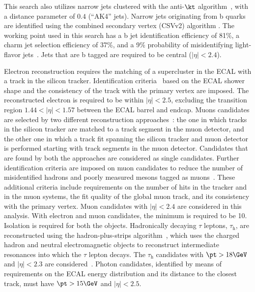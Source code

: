 This search also utilizes narrow jets clustered
with the anti-$\kt$ algorithm~\cite{Cacciari:2008gp}, with a distance
parameter of $0.4$ (“AK4” jets). Narrow jets originating from b quarks are identified using the combined secondary vertex (CSVv2) algorithm \cite{Sirunyan:2017ezt}. The working point used in this search has a b jet identification efficiency of 81\%, a charm jet selection efficiency of 37\%, and a 9\% probability of misidentifying light-flavor jets~\cite{Sirunyan:2017ezt}. Jets that are b tagged are required to be central ($|\eta|<2.4$).

Electron reconstruction requires the matching of a supercluster in the ECAL with a track in the silicon tracker.
Identification criteria~\cite{Khachatryan:2015hwa} based on the ECAL shower shape and the consistency of the track with the primary vertex are imposed. The reconstructed electron is required to be within $|\eta|< 2.5$, excluding the transition region $1.44<|\eta|<1.57$ between the ECAL barrel and endcap. Muons candidates are selected by two different reconstruction approaches~\cite{CMSMuonJINST}: the one in which tracks in the silicon tracker are matched to a track
 segment in the muon detector, and the other one in which a track
 fit spanning the silicon tracker and muon detector is performed
 starting with track segments in the muon detector. Candidates that are found by both the approaches are considered as single candidates.
Further identification criteria are imposed on muon candidates to reduce the number of misidentified hadrons and poorly measured mesons tagged as muons~\cite{CMSMuonJINST}. 
These additional criteria include requirements on the number of hits in the tracker and in the muon systems, the fit quality of the global muon track, and its consistency with the primary vertex.
Muon candidates with $|\eta|< 2.4$ are considered in this analysis. 
With electron and muon candidates, the minimum \pt is required to be 10\GeV. Isolation is required for both the objects.
Hadronically decaying $\tau$ leptons, $\tau_\mathrm{h}$, are reconstructed using the hadron-plus-strips
  algorithm~\cite{CMSTauJINST}, which uses the charged hadron and neutral electromagnetic objects 
to reconstruct intermediate resonances into which the $\tau$ lepton decays. The $\tau_\mathrm{h}$
candidates with $\pt>18\GeV$ and $|\eta|< 2.3$ are considered~\cite{Khachatryan:2015hwa,Chatrchyan:2013sba,CMSTauJINST}. Photon candidates, identified by means of requirements on the ECAL energy distribution and its distance to the closest track, must have $\pt>15\GeV$ and $|\eta|< 2.5$. %

